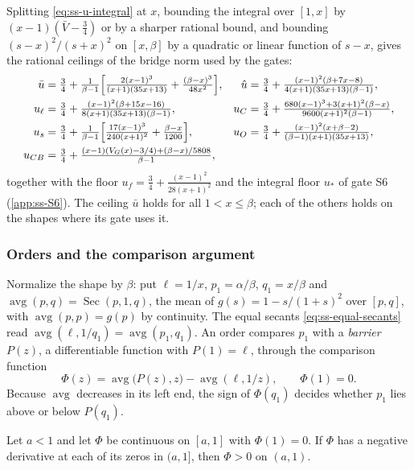  Splitting \eqref{eq:ss-u-integral} at $x$, bounding the integral over
$[1,x]$ by $(x-1)(\bar V-\frac34)$ or by a sharper rational bound, and bounding $(s-x)^2/(s+x)^2$
on $[x,\beta]$ by a quadratic or linear function of $s-x$, gives the rational ceilings of the
bridge norm used by the gates:
\begin{align*}
  \bar u&=\tfrac34+\tfrac{1}{\beta-1}\Bigl[\tfrac{2(x-1)^3}{(x+1)(35x+13)}
   +\tfrac{(\beta-x)^3}{48x^2}\Bigr],&
  \hat u&=\tfrac34+\tfrac{(x-1)^2(\beta+7x-8)}{4(x+1)(35x+13)(\beta-1)},\\
  u_\ell&=\tfrac34+\tfrac{(x-1)^2(\beta+15x-16)}{8(x+1)(35x+13)(\beta-1)},&
  u_C&=\tfrac34+\tfrac{680(x-1)^3+3(x+1)^2(\beta-x)}{9600(x+1)^2(\beta-1)},\\
  u_s&=\tfrac34+\tfrac{1}{\beta-1}\Bigl[\tfrac{17(x-1)^3}{240(x+1)^2}+\tfrac{\beta-x}{1200}\Bigr],&
  u_O&=\tfrac34+\tfrac{(x-1)^2(x+\beta-2)}{(\beta-1)(x+1)(35x+13)},\\
  u_{CB}&=\tfrac34+\tfrac{(x-1)(V_G(x)-3/4)+(\beta-x)/5808}{\beta-1},
\end{align*}
together with the floor $u_f=\frac34+\frac{(x-1)^2}{28(x+1)^2}$ and the integral floor $u_*$ of
gate S6 (\cref{app:ss-S6}). The ceiling $\bar u$ holds for all $1<x\le\beta$; each of the others
holds on the shapes where its gate uses it.

\subsubsection{Orders and the comparison argument}\label{app:ss-orders}

Normalize the shape by $\beta$: put $\ell=1/x$, $p_1=\alpha/\beta$, $q_1=x/\beta$ and
$\operatorname{avg}(p,q)=\operatorname{Sec}(p,1,q)$, the mean of $g(s)=1-s/(1+s)^2$ over $[p,q]$, with $\operatorname{avg}(p,p)=g(p)$ by continuity.
The equal secants \eqref{eq:ss-equal-secants} read
$\operatorname{avg}(\ell,1/q_1)=\operatorname{avg}(p_1,q_1)$. An order compares $p_1$ with a
\emph{barrier} $P(z)$, a differentiable function with $P(1)=\ell$, through the comparison function
\[
  \Phi(z)=\operatorname{avg}\bigl(P(z),z\bigr)-\operatorname{avg}(\ell,1/z),\qquad\Phi(1)=0 .
\]
Because $\operatorname{avg}$ decreases in its left end, the sign of $\Phi(q_1)$ decides whether
$p_1$ lies above or below $P(q_1)$.

\begin{lemma}\label{lem:ss-first-contact}
Let $a<1$ and let $\Phi$ be continuous on $[a,1]$ with $\Phi(1)=0$. If $\Phi$ has a negative
derivative at each of its zeros in $(a,1]$, then $\Phi>0$ on $(a,1)$.
\end{lemma}

